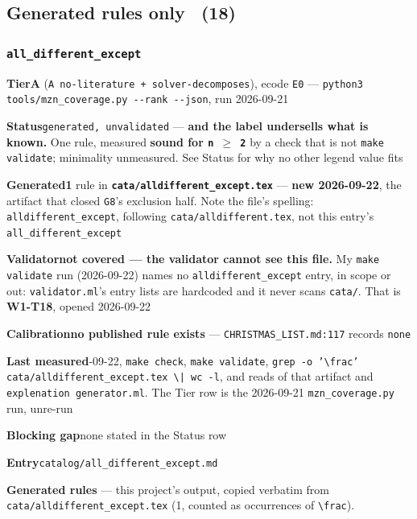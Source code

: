 \documentclass[10pt,a4paper]{article}
\newcommand{\entryfield}[2]{{\raggedright\textbf{#1}\quad #2\par}}
\begin{document}
\subsection*{Generated rules only \ \normalsize(18)}
\subsubsection*{\texttt{all\_\allowbreak{}different\_\allowbreak{}except}}
\label{entry:all-different-except}
\entryfield{Tier}{\textbf{A} (\texttt{A no-\allowbreak{}literature + solver-\allowbreak{}decomposes}), ecode \texttt{E0} --- \texttt{python3 tools/\allowbreak{}mzn\_\allowbreak{}coverage.\allowbreak{}py -\allowbreak{}-\allowbreak{}rank -\allowbreak{}-\allowbreak{}json}, run 2026-09-21}
\entryfield{Status}{\texttt{generated, unvalidated} --- \textbf{and the label undersells what is known.} One rule, measured \textbf{sound for \texttt{n $\geq$ 2}} by a check that is not \texttt{make validate}; minimality unmeasured. See Status for why no other legend value fits}
\entryfield{Generated}{\textbf{1} rule in \textbf{\texttt{cata/\allowbreak{}alldifferent\_\allowbreak{}except.\allowbreak{}tex}} --- \textbf{new 2026-09-22}, the artifact that closed \texttt{G8}'s exclusion half. Note the file's spelling: \texttt{alldifferent\_except}, following \texttt{cata/alldifferent.tex}, not this entry's \texttt{all\_different\_except}}
\entryfield{Validator}{\textbf{not covered --- the validator cannot see this file.} My \texttt{make validate} run (2026-09-22) names no \texttt{alldifferent\_except} entry, in scope or out: \texttt{validator.ml}'s entry lists are hardcoded and it never scans \texttt{cata/}. That is \textbf{W1-T18}, opened 2026-09-22}
\entryfield{Calibration}{\textbf{no published rule exists} --- \texttt{CHRISTMAS\_LIST.md:117} records \texttt{none}}
\entryfield{Last measured}{2026-09-22, \texttt{make check}, \texttt{make validate}, \texttt{grep -\allowbreak{}o '\textbackslash{}frac' cata/\allowbreak{}alldifferent\_\allowbreak{}except.\allowbreak{}tex \textbackslash{}| wc -\allowbreak{}l}, and reads of that artifact and \texttt{explenation generator.ml}. The Tier row is the 2026-09-21 \texttt{mzn\_coverage.py} run, unre-run}
\entryfield{Blocking gap}{none stated in the Status row}
\entryfield{Entry}{\texttt{catalog/all\_different\_except.md}}

\textbf{Generated rules} --- this project's output, copied verbatim from \texttt{cata/alldifferent\_except.tex} (1, counted as occurrences of \texttt{\textbackslash{}frac}).\par
\end{document}
